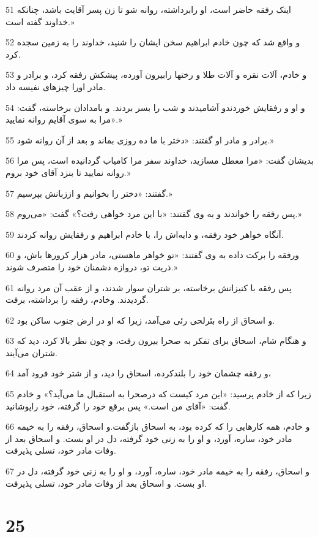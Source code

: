 \par 51 اینک رفقه حاضر است، او رابرداشته، روانه شو تا زن پسر آقایت باشد، چنانکه خداوند گفته است.»
\par 52 و واقع شد که چون خادم ابراهیم سخن ایشان را شنید، خداوند را به زمین سجده کرد.
\par 53 و خادم، آلات نقره و آلات طلا و رختها رابیرون آورده، پیشکش رفقه کرد، و برادر و مادر اورا چیزهای نفیسه داد.
\par 54 و او و رفقایش خوردندو آشامیدند و شب را بسر بردند. و بامدادان برخاسته، گفت: «مرا به سوی آقایم روانه نمایید.»
\par 55 برادر و مادر او گفتند: «دختر با ما ده روزی بماند و بعد از آن روانه شود.»
\par 56 بدیشان گفت: «مرا معطل مسازید، خداوند سفر مرا کامیاب گردانیده است، پس مرا روانه نمایید تا بنزد آقای خود بروم.»
\par 57 گفتند: «دختر را بخوانیم و اززبانش بپرسیم.»
\par 58 پس رفقه را خواندند و به وی گفتند: «با این مرد خواهی رفت؟» گفت: «می‌روم.»
\par 59 آنگاه خواهر خود رفقه، و دایه‌اش را، با خادم ابراهیم و رفقایش روانه کردند.
\par 60 ورفقه را برکت داده به وی گفتند: «تو خواهر ماهستی، مادر هزار کرورها باش، و ذریت تو، دروازه دشمنان خود را متصرف شوند.»
\par 61 پس رفقه با کنیزانش برخاسته، بر شتران سوار شدند، و از عقب آن مرد روانه گردیدند. وخادم، رفقه را برداشته، برفت.
\par 62 و اسحاق از راه بئرلحی رئی می‌آمد، زیرا که او در ارض جنوب ساکن بود.
\par 63 و هنگام شام، اسحاق برای تفکر به صحرا بیرون رفت، و چون نظر بالا کرد، دید که شتران می‌آیند.
\par 64 و رفقه چشمان خود را بلندکرده، اسحاق را دید، و از شتر خود فرود آمد،
\par 65 زیرا که از خادم پرسید: «این مرد کیست که درصحرا به استقبال ما می‌آید؟» و خادم گفت: «آقای من است.» پس برقع خود را گرفته، خود راپوشانید.
\par 66 و خادم، همه کارهایی را که کرده بود، به اسحاق باز‌گفت.و اسحاق، رفقه را به خیمه مادر خود، ساره، آورد، و او را به زنی خود گرفته، دل در او بست. و اسحاق بعد از وفات مادر خود، تسلی پذیرفت.
\par 67 و اسحاق، رفقه را به خیمه مادر خود، ساره، آورد، و او را به زنی خود گرفته، دل در او بست. و اسحاق بعد از وفات مادر خود، تسلی پذیرفت.
 
\chapter{25}

